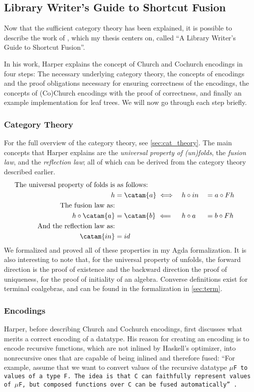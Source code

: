 \subsection{Library Writer's Guide to Shortcut Fusion}\label{sec:libfusion}
Now that the sufficient category theory has been explained, it is possible to describe the work of \cite{Harper2011}, which my thesis centers on, called ``A Library Writer's Guide to Shortcut Fusion''.

In his work, Harper explains the concept of Church and Cochurch encodings in four steps:
The necessary underlying category theory, the concepts of encodings and the proof obligations necessary for ensuring correctness of the encodings, the concepts of (Co)Church encodings with the proof of correctness, and finally an example implementation for leaf trees.
We will now go through each step briefly.

\subsubsection{Category Theory}
For the full overview of the category theory, see \autoref{sec:cat_theory}.
The main concepts that Harper explains are the \textit{universal property of (un)folds}, the \textit{fusion law}, and the \textit{reflection law}; all of which can be derived from the category theory described earlier.
\begin{alignat*}{3}
\text{The universal property of folds is}&\text{ as follows:} \\
h &= \catam{a} \iff && h \circ in &&= a \circ F h \\
\text{The fusion law as:} \\
h \circ \catam{a} &= \catam{b}~\Longleftarrow && h \circ a &&= b \circ F h \\
\text{And the reflection law as:} \\
\catam{in} &= id
\end{alignat*}
We formalized and proved all of these properties in my Agda formalization.
It is also interesting to note that, for the universal property of unfolds, the forward direction is the proof of existence and the backward direction the proof of uniqueness, for the proof of initiality of an algebra.
Converse definitions exist for terminal coalgebras, and can be found in the formalization in \autoref{sec:term}.

\subsubsection{Encodings}\label{sec:obligations}
Harper, before describing Church and Cochurch encodings, first discusses what merits a correct encoding of a datatype.
His reason for creating an encoding is to encode recursive functions, which are not inlined by Haskell's optimizer, into nonrecursive ones that are capable of being inlined and therefore fused:
``For example, assume that we want to convert values of the recursive datatype \tt{$\mu$F} to values of a type \tt{F}.  The idea is that \tt{C} can faithfully represent values of \tt{$\mu$F}, but composed functions over \tt{C} can be fused automatically'' \citep{Harper2011}.

